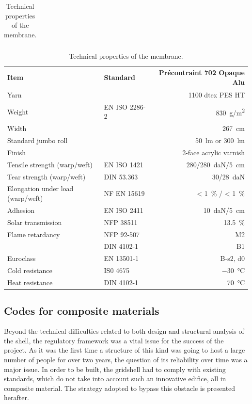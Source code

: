\begin{table}[p]
\begin{fullpage}
\begin{tabular}{@{}l l r @{}}
	\bottomrule
	\end{tabular}
	\caption{Technical properties of the tube.}
	\label{tab:tube}
	\vspace{1.25cm}
 	\begin{tabular}{@{}l l r @{}}
	\toprule
	Item 							& Standard 				& Précontraint 702 Opaque Alu  \\
	\midrule
	Yarn 							& 						& 1100 dtex PES HT \\
	Weight 						& EN ISO 2286-2			& \SI{830}{g/m^2} \\
	Width 						& 						& \SI{267}{cm} \\
	Standard jumbo roll				& 						& \SI{50}{lm} or \SI{300}{lm}  \\
	Finish						& 						& 2-face acrylic varnish \\
	\midrule
	Tensile strength (warp/weft)		& EN ISO  1421			& \SI{280/280}{daN/ \SI{5}{\cm}} \\
	Tear strength (warp/weft)			& DIN 53.363				& \SI{30/28}{daN} \\
	Elongation under load (warp/weft)	& NF EN 15619				& < \SI{1}{\percent} / < \SI{1}{\percent} \\
	Adhesion						& EN ISO  2411			& \SI{10}{daN/ \SI{5}{\cm}} \\
	Solar transmission				& NFP 38511				& \SI{13.5}{\percent}  \\
	\midrule
	Flame retardancy				& NFP 92-507 				& M2 \\
								& DIN 4102-1 				& B1 \\
	Euroclass						& EN 13501-1 				& B-s2, d0 \\
	\midrule
	Cold resistance					& IS0 4675 				& \SI{-30}{\celsius} \\
	Heat resistance					& DIN 4102-1 				& \SI{+70}{\celsius} \\
	\bottomrule
	\end{tabular}
	\caption{Technical properties of the membrane.}
	\label{tab:membrane}
\end{fullpage}
\end{table}

\subsection{Codes for composite materials}\label{sec=codes}
Beyond the technical difficulties related to both design and structural analysis of the shell, the regulatory framework was a vital issue for the success of the project. As it was the first time a structure of this kind was going to host a large number of people for over two years, the question of its reliability over time was a major issue. In order to be built, the gridshell had to comply with existing standards, which do not take into account such an innovative edifice, all in composite material. The strategy adopted to bypass this obstacle is presented herafter.

